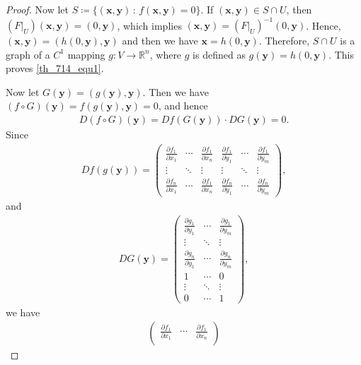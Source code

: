 \documentclass[11pt]{book}
\theoremstyle{definition}
\numberwithin{equation}{chapter}
\begin{document}
\begin{proof}
Now let $S \coloneqq \{(\mathbf{x},\mathbf{y}) \,:\, f(\mathbf{x}, \mathbf{y}) = 0\}$. If $(\mathbf{x}, \mathbf{y}) \in S \cap U$, then $(F|_{U})(\mathbf{x}, \mathbf{y}) = (0,\mathbf{y})$, which implies $(\mathbf{x}, \mathbf{y}) = \left(F|_{U}\right)^{-1}(0,\mathbf{y})$. Hence, $(\mathbf{x}, \mathbf{y}) = (h(0, \mathbf{y}), \mathbf{y})$ and then we have $\mathbf{x} = h(0, \mathbf{y})$. Therefore, $S \cap U$ is a graph of a $C^1$ mapping $g: V \to \mathbb{R}^n$, where $g$ is defined as $g(\mathbf{y}) = h(0, \mathbf{y})$. This proves \eqref{th_714_equ1}.

\medskip

Now let $G(\mathbf{y}) = (g(\mathbf{y}), \mathbf{y})$. Then we have $(f \circ G)(\mathbf{y}) = f(g(\mathbf{y}), \mathbf{y}) = 0$, and hence
\begin{align*}
    D(f \circ G)(\mathbf{y}) = Df(G(\mathbf{y})) \cdot DG(\mathbf{y}) = 0.
\end{align*}
Since
\begin{align*}
    Df(g(\mathbf{y})) = \begin{pmatrix}
        \frac{\partial f_1}{\partial x_1} & \cdots & \frac{\partial f_1}{\partial x_n} &  \frac{\partial f_1}{\partial y_1} & \cdots & \frac{\partial f_1}{\partial y_m}\\
        \vdots & \ddots & \vdots & \vdots & \ddots & \vdots \\
        \frac{\partial f_n}{\partial x_1} & \cdots & \frac{\partial f_1}{\partial x_n} & \frac{\partial f_n}{\partial y_1} & \cdots & \frac{\partial f_n}{\partial y_m}
    \end{pmatrix},
\end{align*}
and
\begin{align*}
    DG(\mathbf{y}) = \begin{pmatrix}
        \frac{\partial g_1}{\partial y_1} & \cdots & \frac{\partial g_1}{\partial y_m} \\
        \vdots & \ddots & \vdots \\
        \frac{\partial g_n}{\partial y_1} & \cdots & \frac{\partial g_n}{\partial y_m} \\
        1 & \cdots & 0 \\
        \vdots & \ddots & \vdots \\
        0 & \cdots & 1
    \end{pmatrix},
\end{align*}
we have
\begin{align*}
    \begin{pmatrix}
        \frac{\partial f_1}{\partial x_1} & \cdots & \frac{\partial f_1}{\partial x_n} \\

\end{pmatrix}
\end{align*}
\end{proof}
\end{document}
